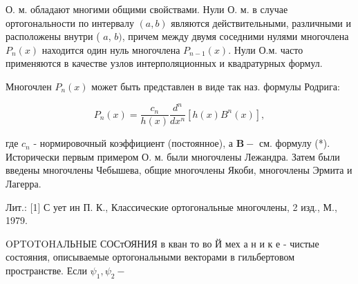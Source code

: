 \documentclass[10pt]{article}
\begin{document}
О. м. обладают многими общими свойствами. Нули О. м. в случае ортогональности по интервалу $(a, b)$ являются действительными, различными и расположены внутри ( $a$, $b)$, причем между двумя соседними нулями многочлена $P_{n}(x)$ находится один нуль многочлена $P_{n-1}(x)$. Нули О.м. часто применяются в качестве узлов интерполяционных и квадратурных формул.



Многочлен $P_{n}(x)$ может быть представлен в виде так наз. формулы Родрига:



\[

P_{n}(x)=\frac{c_{n}}{h(x)} \frac{d^{n}}{d x^{n}}\left[h(x) B^{n}(x)\right],

\]



где $c_{n}$ - нормировочный коэффициент (постоянное), а $\boldsymbol{B}-$ см. формулу (*). Исторически первым примером О. м. были многочлены Лежандра. Затем были введены многочлены Чебышева, общие многочлены Якоби, многочлены Эрмита и Лагерра.



Лит.: [1] С ует ин П. К., Классические ортогональные многочлены, 2 изд., М., 1979.



OPTOTOHAЛЬHЫЕ СОСтОЯНИЯ в кван то во Й мех а н и к е - чистые состояния, описываемые ортогональными векторами в гильбертовом пространстве. Если $\psi_{1}, \psi_{2}-$
\end{document}
